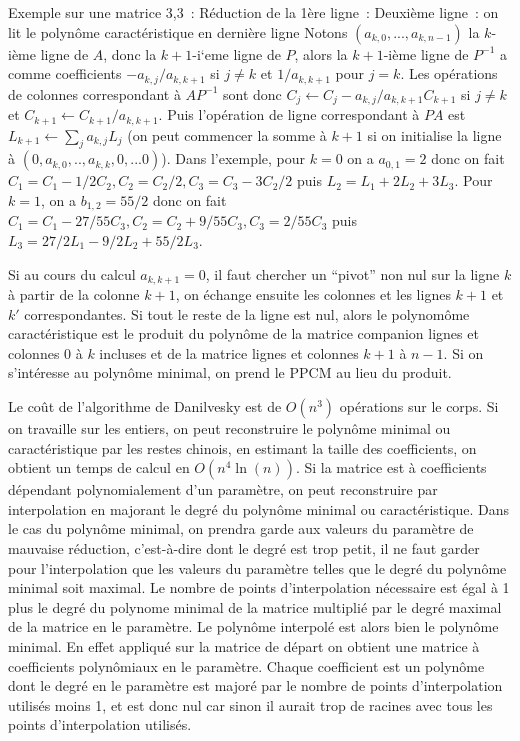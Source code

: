 \documentclass[a4paper,11pt]{article}
\begin{document}
\begin{giacjshere}
Exemple sur une matrice 3,3~:
R\'eduction de la 1\`ere ligne~:
Deuxi\`eme ligne~:
on lit le polyn\^ome caract\'eristique en derni\`ere ligne
Notons $(a_{k,0},...,a_{k,n-1})$ la $k$-i\`eme ligne de $A$,
donc la $k+1$-i`eme ligne de $P$, alors la $k+1$-i\`eme ligne de 
$P^{-1}$ a comme coefficients $-a_{k,j}/a_{k,k+1}$ si $j\neq k$ et 
$1/a_{k,k+1}$ pour $j=k$. 
Les op\'erations de colonnes correspondant \`a $AP^{-1}$ sont donc
$C_j \leftarrow C_j-a_{k,j}/a_{k,k+1}C_{k+1}$ si $j \neq k$ et 
$C_{k+1} \leftarrow C_{k+1}/a_{k,k+1}$. Puis l'op\'eration de ligne
correspondant \`a $PA$ est $L_{k+1} \leftarrow \sum_j a_{k,j} L_j$ (on peut
commencer la somme \`a $k+1$ si on initialise la ligne \`a
$(0,a_{k,0},..,a_{k,k},0,...0)$).
Dans l'exemple, pour $k=0$ on a $a_{0,1}=2$ donc on fait
$C_1=C_1-1/2C_2, C_2=C_2/2, C_3=C_3-3C_2/2$ puis $L_2=L_1+2L_2+3L_3$.
Pour $k=1$, on a $b_{1,2}=55/2$ donc on fait 
$C_1=C_1-27/55C_3, C_2=C_2+9/55C_3, C_3=2/55C_3$ puis
$L_3=27/2L_1-9/2L_2+55/2L_3$.

Si au cours du calcul $a_{k,k+1}=0$, il faut chercher un ``pivot'' non nul
sur la ligne $k$ \`a partir de la colonne $k+1$, on \'echange ensuite les
colonnes et les lignes $k+1$ et $k'$ correspondantes. Si tout le reste
de la ligne est nul, alors le polynom\^ome caract\'eristique est le
produit du polyn\^ome de la matrice companion lignes et colonnes 
0 \`a $k$ incluses et de la matrice lignes et colonnes $k+1$ \`a $n-1$.
Si on s'int\'eresse au polyn\^ome minimal, on prend le PPCM
au lieu du produit.

Le co\^ut de l'algorithme de Danilvesky est de $O(n^3)$ op\'erations
sur le corps. Si on travaille sur les entiers, on peut reconstruire
le polyn\^ome minimal ou caract\'eristique par les restes chinois,
en estimant la taille des coefficients, on obtient un temps de calcul
en $O(n^4 \ln(n))$. Si la matrice est \`a coefficients d\'ependant 
polynomialement d'un param\`etre, on peut reconstruire par interpolation
en majorant le degr\'e du polyn\^ome minimal ou caract\'eristique. Dans
le cas du polyn\^ome minimal, on prendra garde aux valeurs du param\`etre
de mauvaise r\'eduction, c'est-\`a-dire dont le degr\'e est trop petit, il
ne faut garder pour l'interpolation que les valeurs du param\`etre telles
que le degr\'e du polyn\^ome minimal soit maximal. Le nombre
de points d'interpolation n\'ecessaire est \'egal \`a 1 plus le degr\'e du
polynome minimal de la matrice multipli\'e par le degr\'e maximal
de la matrice en le param\`etre.
Le polyn\^ome interpol\'e
est alors bien le polyn\^ome minimal. En effet 
appliqu\'e sur la matrice de d\'epart
on obtient une matrice \`a coefficients polyn\^omiaux en le param\`etre.
Chaque coefficient est un polyn\^ome 
dont le degr\'e en le param\`etre est major\'e par le nombre de points
d'interpolation utilis\'es moins 1, et est donc nul car sinon il aurait
trop de racines avec tous les points d'interpolation utilis\'es.


\end{giacjshere}
\end{document}
